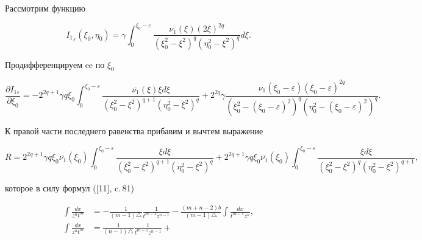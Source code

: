 \begin{pf}


Рассмотрим функцию


$$


{I_1}_\varepsilon (\xi_0,\eta_0)=


\gamma\int_0^{\xi_0-\varepsilon } \frac{\nu_1(\xi)(2\xi)^{2q}}


{(\xi_0^2-\xi^2)^q(\eta_0^2-\xi^2)^q}d\xi.


$$


Продифференцируем ee по $\xi_0$


$$


\frac{\partial I_{1\varepsilon}}{\partial \xi_0}= 


-2^{2q+1}\gamma q\xi_0\int_0^{\xi_0-\varepsilon } 


\frac{\overline{\nu_1}(\xi) \xi d\xi}


{(\xi_0^2-\xi^2)^{q+1}(\eta_0^2-\xi^2)^q}+


2^{2q}\gamma \frac{\nu_1(\xi_0-\varepsilon)(\xi_0-\varepsilon)^{2q}}


{(\xi_0^2-(\xi_0-\varepsilon)^2)^q(\eta_0^2-(\xi_0-\varepsilon)^2)^q}.


$$


К правой части последнего равенства прибавим и вычтем выражение


$$


R=2^{2q+1}\gamma q\xi_0\overline {\nu_1}(\xi_0)


\int_0^{\xi_0-\varepsilon } 


\frac{\xi d\xi}


{(\xi_0^2-\xi^2)^{q+1}(\eta_0^2-\xi^2)^q}+


2^{2q+1}\gamma q\xi_0\overline{\nu_1}(\xi_0)


\int_0^{\xi_0-\varepsilon } 


\frac{\xi d\xi }


{(\xi_0^2-\xi^2)^q (\eta_0^2-\xi^2)^{q+1}},


$$


которое в силу формул ([11], c.\,81)


\begin{align*}


\int\frac{dx}{z^nt^m}&=-\frac{1}{(m-1)\triangle}\frac{1}{t^{m-1}z^{n-1}}-


\frac{(m+n-2)b}{(m-1)\triangle}\int \frac{dx}{t^{m-1}z^n},\\


%


\int\frac{dx}{z^nt^m}&=\frac{1}{(n-1)\triangle}\frac{1}{t^{m-1}z^{n-1}}+



\end{align*}
\end{pf}
